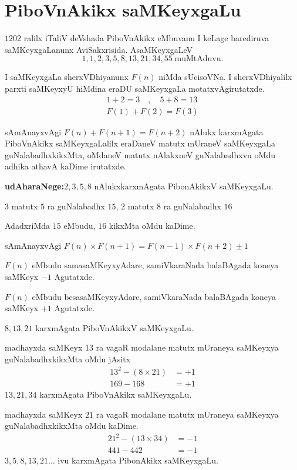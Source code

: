 \chapter{PiboVnAkikx saMKeyxgaLu}
\vskip -20pt

$1202$ ralilx iTaliV deVshada PiboVnAkikx eMbuvanu I keLage barediruva saMKeyxgaLanunx AviSakxrisida. AsaMKeyxgaLeV
$$
1,1,2,3,5,8,13,21,34,55 \;  \text{muMtAduvu}.
$$ 

I saMKeyxgaLa sherxVDhiyanunx $F(n)$ niMda sUcisoVNa. I sherxVDhiyalilx parxti saMKeyxyU hiMdina eraDU saMKeyxgaLa motatxvAgirutatxde.
\begin{gather*}
1+2=3\quad , \quad 5+8=13\\
F(1)+F(2) = F(3)
 \end{gather*}

sAmAnayxvAgi $F(n) + F(n+1) = F(n+2)$ nAlukx karxmAgata PiboVnAkikx saMKeyxgaLalilx eraDaneV matutx mUraneV saMKeyxgaLa guNalabadhxkikxMta, oMdaneV matutx nAlakxneV guNalabadhxvu oMdu adhika athavA kaDime irutatxde.

\textbf{udAharaNege:}\quad $2,3,5,8$ nAlukxkarxmAgata PibonAkikxV saMKeyxgaLu.

$3$ matutx $5$ ra guNalabadhx $15$, $2$ matutx $8$ ra guNalabadhx $16$  

AdadxriMda $15$ eMbudu, $16$ kikxMta oMdu kaDime.

sAmAnayxvAgi $F(n)\times F(n+1) = F(n-1)\times F(n+2)\pm1$ 

$F(n)$ eMbudu samasaMKeyxyAdare, samiVkaraNada balaBAgada koneya saMKeyx $-1$ Agutatxde.

$F(n)$ eMbudu besasaMKeyxyAdare, samiVkaraNada balaBAgada koneya saMKeyx $+1$ Agutatxde.

$8,13,21$ karxmAgata PiboVnAkikxV saMKeyxgaLu.

madhayxda saMKeyx $13$ ra vagaR modalane matutx mUraneya saMKeyxya guNalabadhxkikxMta oMdu jAsitx
\begin{align*}
13^2-(8\times 21) &=+1\\
169-168 &= +1
\end{align*}
$13,21,34$ karxmAgata PiboVnAkikx saMKeyxgaLu. 

madhayxda saMKeyx $21$ ra vagaR  modalane  matutx mUraneya saMKeyxya guNalabadhxkikxMta oMdu kaDime.
\begin{align*}
21^2 - (13\times 34) &= -1 \\
441-442 &= -1
\end{align*}
$3,5,8,13,21\hdots$ ivu karxmAgata PibonAkikx saMKeyxgaLu.

